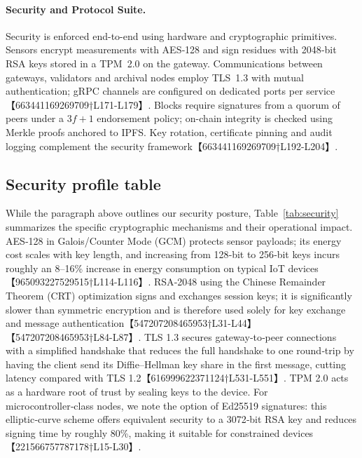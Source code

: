 \paragraph{Security and Protocol Suite.}  Security is enforced end-to-end using hardware and cryptographic primitives.  Sensors encrypt measurements with AES‑128 and sign residues with 2048‑bit RSA keys stored in a TPM~2.0 on the gateway.  Communications between gateways, validators and archival nodes employ TLS~1.3 with mutual authentication; gRPC channels are configured on dedicated ports per service【663441169269709†L171-L179】.  Blocks require signatures from a quorum of peers under a $3f+1$ endorsement policy; on-chain integrity is checked using Merkle proofs anchored to IPFS.  Key rotation, certificate pinning and audit logging complement the security framework【663441169269709†L192-L204】.

\subsection{Security profile table}
While the paragraph above outlines our security posture, Table~\ref{tab:security} summarizes the specific cryptographic mechanisms and their operational impact.  AES‑128 in Galois/Counter Mode (GCM) protects sensor payloads; its energy cost scales with key length, and increasing from 128‑bit to 256‑bit keys incurs roughly an 8–16\% increase in energy consumption on typical IoT devices【965093227529515†L114-L116】.  RSA‑2048 using the Chinese Remainder Theorem (CRT) optimization signs and exchanges session keys; it is significantly slower than symmetric encryption and is therefore used solely for key exchange and message authentication【547207208465953†L31-L44】【547207208465953†L84-L87】.  TLS 1.3 secures gateway‑to‑peer connections with a simplified handshake that reduces the full handshake to one round‑trip by having the client send its Diffie–Hellman key share in the first message, cutting latency compared with TLS 1.2【616999622371124†L531-L551】.  TPM 2.0 acts as a hardware root of trust by sealing keys to the device.  For microcontroller‑class nodes, we note the option of Ed25519 signatures: this elliptic‑curve scheme offers equivalent security to a 3072‑bit RSA key and reduces signing time by roughly 80\%, making it suitable for constrained devices【221566757787178†L15-L30】.

